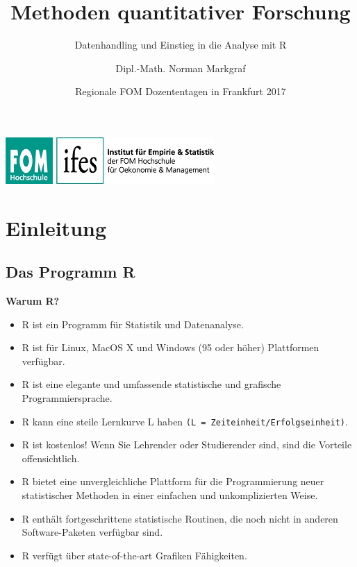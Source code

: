 \documentclass[10pt,ngerman,onside]{article}
\title{Methoden quantitativer Forschung}
\subtitle{Datenhandling und Einstieg in die Analyse mit R}
\author{Dipl.-Math. Norman Markgraf}
\date{Regionale FOM Dozententagen in Frankfurt 2017}
\providecommand{\tightlist}{%
  \setlength{\itemsep}{0pt}\setlength{\parskip}{0pt}}
\begin{document}
\maketitle

\begin{center}
\includegraphics{ifes.jpg}
\end{center}

\tableofcontents
\newpage

\hypertarget{einleitung}{%
\section{Einleitung}\label{einleitung}}

\hypertarget{das-programm-r}{%
\subsection{Das Programm R}\label{das-programm-r}}

\textbf{Warum R?}

\begin{itemize}
\tightlist
\item
  R ist ein Programm für Statistik und Datenanalyse.
\item
  R ist für Linux, MacOS X und Windows (95 oder höher) Plattformen
  verfügbar.
\item
  R ist eine elegante und umfassende statistische und grafische
  Programmiersprache.
\item
  R kann eine steile Lernkurve L haben
  \texttt{(L\ =\ Zeiteinheit/Erfolgseinheit)}.
\item
  R ist kostenlos! Wenn Sie Lehrender oder Studierender sind, sind die
  Vorteile offensichtlich.
\item
  R bietet eine unvergleichliche Plattform für die Programmierung neuer
  statistischer Methoden in einer einfachen und unkomplizierten Weise.
\item
  R enthält fortgeschrittene statistische Routinen, die noch nicht in
  anderen Software-Paketen verfügbar sind.
\item
  R verfügt über state-of-the-art Grafiken Fähigkeiten.
\end{itemize}
\end{document}
